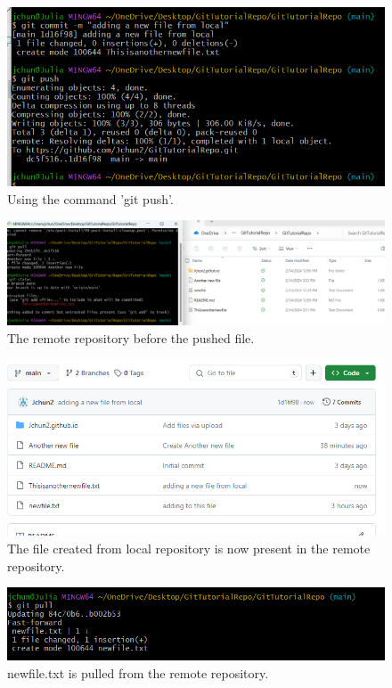 \documentclass[10pt,twocolumn]{article}
\begin{document}
\begin{figure}
    \centering
    \includegraphics[width=.95\linewidth]{gitpush.png}
    \caption{
        Using the command 'git push'.    
    }
    \label{Figure 12}
\end{figure}
\begin{figure}
    \centering
    \includegraphics[width=.95\linewidth]{beforepush.png}
    \caption{
        The remote repository before the pushed file.    
    }
    \label{Figure 13}
\end{figure}
\begin{figure}
    \centering
    \includegraphics[width=.95\linewidth]{pushaddfille.png}
    \caption{
        The file created from local repository is now present in the remote repository.    
    }
    \label{Figure 14}
\end{figure}
\begin{figure}
    \centering
    \includegraphics[width=.95\linewidth]{gitpull.png}
    \caption{
        newfile.txt is pulled from the remote repository.   
    }
    \label{Figure 10}
\end{figure}
\end{document}
